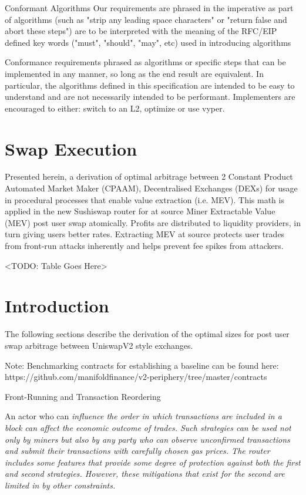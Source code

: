 \documentclass[runningheads]{llncs}
\begin{document}
Conformant Algorithms
Our requirements are phrased in the imperative as part of algorithms (such as "strip any leading space characters" or "return false and abort these steps") are to be interpreted with the meaning of the RFC/EIP defined key words ("must", "should", "may", etc) used in introducing algorithms

\hfill \break

Conformance requirements phrased as algorithms or specific steps that can be implemented in any manner, so long as the end result are equivalent. In particular, the algorithms defined in this specification are intended to be easy to understand and are not necessarily intended to be performant. Implementers are encouraged to either: switch to an L2, optimize or use vyper.



\section{Swap Execution}
	

		Presented herein, a derivation of optimal arbitrage between 2 Constant Product Automated Market Maker (CPAAM), Decentralised Exchanges (DEXs) for usage in procedural processes that enable value extraction (i.e. MEV).
		 This math is applied in the new Sushiswap router for at source Miner Extractable Value (MEV) post user swap atomically. 
		Profits are distributed to liquidity providers, in turn giving users better rates. Extracting MEV at source protects user trades from front-run attacks inherently and helps prevent fee spikes from attackers.

<TODO: Table Goes Here>


	\newpage
	
	\section{Introduction}


    
	
	The following sections describe the derivation of the optimal sizes for post user swap arbitrage between UniswapV2 style exchanges.
	
	Note: Benchmarking contracts for establishing a baseline can be found here: https://github.com/manifoldfinance/v2-periphery/tree/master/contracts
	
	Front-Running and Transaction Reordering

An actor who can \em{influence} the order in which transactions are included in a block can affect the economic outcome of trades. Such strategies can be used not only by miners but also by any party who can observe unconfirmed transactions and submit their transactions with carefully chosen gas prices. The router includes some features that provide some degree of protection against both the first and second strategies. However, these mitigations that exist for the second are limited in by other constraints. 
\end{document}
